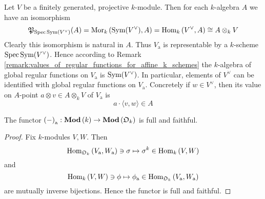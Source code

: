 \begin{remark}\label{remark:representability_of_additive_functor}
Let $V$ be a finitely generated, projective $k$-module. Then for each $k$-algebra $A$ we have an isomorphism
$${\mathfrak P}_{\mathrm{Spec}\, \textrm{Sym}(V^{\vee})}(A) = \mathrm{Mor}_k\left(\textrm{Sym}(V^{\vee}), A\right) = \mathrm{Hom}_k\left(V^{\vee},A\right) \cong A\otimes_kV$$
Clearly this isomorphism is natural in $A$. Thus $V_{\mathrm{a}}$ is representable by a $k$-scheme $\mathrm{Spec}\, \textrm{Sym}(V^{\vee})$. Hence according to Remark \ref{remark:values_of_regular_functions_for_affine_k_schemes} the $k$-algebra of global regular functions on $V_{\mathrm{a}}$ is $\textrm{Sym}(V^{\vee})$. In particular, elements of $V^{\vee}$ can be identified with global regular functions on $V_{\mathrm{a}}$. Concretely if $w\in V^{\vee}$, then its value on $A$-point $a\otimes v\in A\otimes_kV$ of $V_{\mathrm{a}}$ is
$$a\cdot \langle v, w\rangle\in A$$
\end{remark}

\begin{proposition}\label{proposition:inclusion_of_k_modules_into_O_k_modules}
The functor $\left(-\right)_{\mathrm{a}}:\mathbf{Mod}\left(k\right)\rightarrow \mathbf{Mod}\left({\mathfrak O}_k\right)$ is full and faithful.
\end{proposition}
\begin{proof}
Fix $k$-modules $V,W$. Then
$$\mathrm{Hom}_{{\mathfrak O}_k}\left(V_{\mathrm{a}},W_{\mathrm{a}}\right)\ni \sigma \mapsto \sigma^k\in \mathrm{Hom}_k\left(V,W\right)$$
and
$$\mathrm{Hom}_k\left(V,W\right) \ni \phi \mapsto \phi_{\mathrm{a}} \in \mathrm{Hom}_{{\mathfrak O}_k}\left(V_{\mathrm{a}},W_{\mathrm{a}}\right)$$
are mutually inverse bijections. Hence the functor is full and faithful.
\end{proof}

